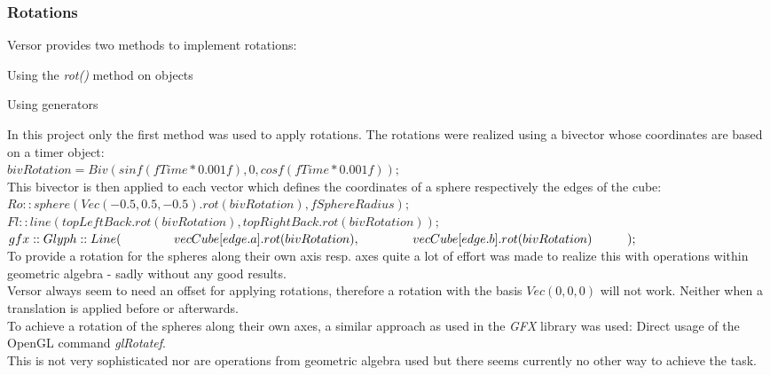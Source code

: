 \documentclass[pdftex,12pt,a4paper]{article}
\begin{document}
\subsubsection{Rotations}
Versor provides two methods to implement rotations:\\
\begin{compactitem}
	\item Using the \textit{rot()} method on objects
	\item Using generators
\end{compactitem}
\vspace*{2mm}
\noindent\hspace*{0mm}In this project only the first method was used to apply rotations. The rotations were realized using a \gls{bivector} whose coordinates are based on a timer object:\vspace*{5mm}\\
\noindent\hspace*{10mm}\vspace*{5mm} $ bivRotation = Biv(sinf(fTime * 0.001f), 0, cosf(fTime * 0.001f)); $\\
\noindent\hspace*{0mm}This bivector is then applied to each vector which defines the coordinates of a sphere respectively the edges of the cube:\vspace*{5mm}\\
\noindent\hspace*{10mm}\vspace*{5mm} $ Ro::sphere(Vec(-0.5, 0.5, -0.5).rot(bivRotation), fSphereRadius); $\\
\noindent\hspace*{10mm}\vspace*{5mm} $  Fl::line(topLeftBack.rot(bivRotation), topRightBack.rot(bivRotation)); $\\
\noindent\hspace*{10mm}$ gfx::Glyph::Line(\\
	\noindent\hspace*{15mm}vecCube[edge.a].rot(bivRotation),\\
	\noindent\hspace*{15mm}vecCube[edge.b].rot(bivRotation)\\
\noindent\hspace*{10mm}); $\\
\noindent\hspace*{0mm}To provide a rotation for the spheres along their own axis resp. axes quite a lot of effort was made to realize this with operations within geometric algebra - sadly without any good results.\\
Versor always seem to need an offset for applying rotations, therefore a rotation with the basis $ Vec(0, 0, 0) $ will not work. Neither when a translation is applied before or afterwards.\\
To achieve a rotation of the spheres along their own axes, a similar approach as used in the \textit{GFX} library was used: Direct usage of the OpenGL command \textit{glRotatef}.\\
This is not very sophisticated nor are operations from geometric algebra used but there seems currently no other way to achieve the task.
\end{document}
